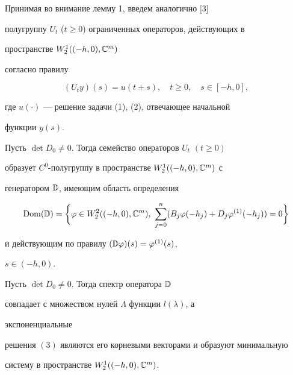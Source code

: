  


Принимая во внимание лемму 1, введем аналогично [3] 


полугруппу $U_t$ ($t\ge0$) ограниченных операторов, действующих в 


пространстве $W^1_2((-h,0),\Bbb C^m)$ 


согласно правилу 


$$ 


(U_t y)(s)=u(t+s),\quad t\ge0,\quad s\in[-h,0], 


$$ 


где $u(\cdot)$ --- решение задачи (1), (2), отвечающее начальной 


функции $y(s)$. 


 


\begin{lem} 


Пусть $\det D_0\ne0$. Тогда семейство операторов $U_t$ $(t\ge0)$ 


образует $C^0$-полугруппу в пространстве $W^1_2((-h,0),\Bbb C^m)$ с 


генератором $\Bbb D$, имеющим область определения 


$$ 


\Dom(\Bbb D)=\bigg\{\varphi\in W^2_2((-h,0),\Bbb C^m), 


\ \sum^n_{j=0}(B_j\varphi(-h_j)+D_j\varphi^{(1)}(-h_j))=0\bigg\}


$$ 


и действующим по правилу $(\Bbb D\varphi)(s)=\varphi^{(1)}(s)$, 


$s\in(-h,0)$. 


\end{lem} 


 


\begin{prop} 


Пусть $\det D_0\ne0$. Тогда спектр оператора $\Bbb D$ 


совпадает с множеством нулей $\Lambda$ функции $l(\lambda)$, а 


экспоненциальные 


решения $(3)$ являются его корневыми векторами и образуют минимальную 


систему в пространстве $W^1_2((-h,0),\Bbb C^m)$. 


\end{prop} 


 


